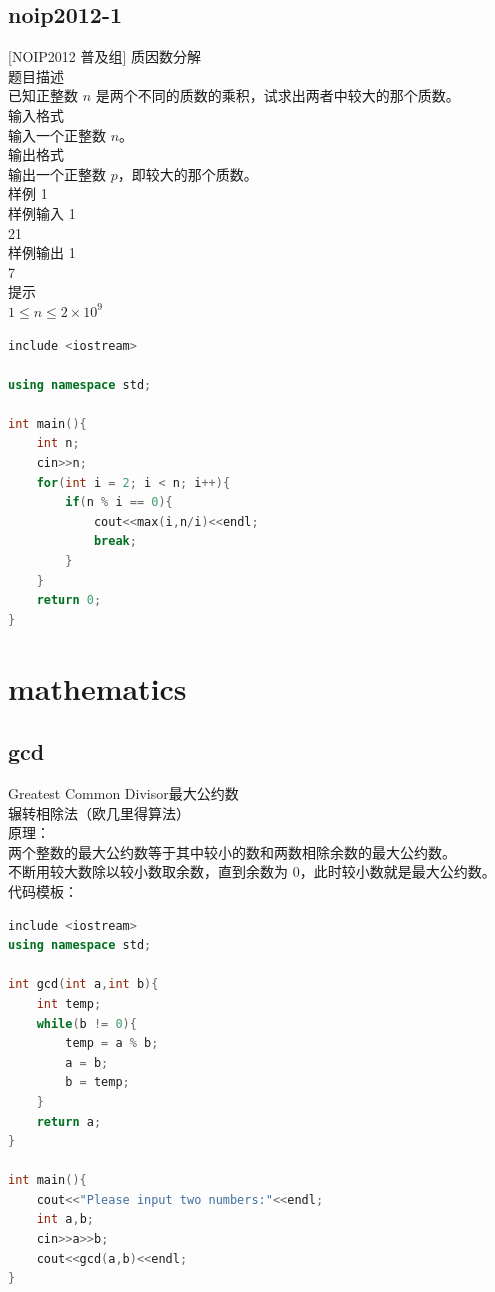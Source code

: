 \documentclass[12pt,twiside,a4paper]{ctexbook}
\numberwithin{chapter}{part}
\begin{document}
\section{noip2012-1}
 [NOIP2012 普及组] 质因数分解\\
 题目描述\\
已知正整数 $n$ 是两个不同的质数的乘积，试求出两者中较大的那个质数。\\
 输入格式\\
输入一个正整数 $n$。\\
 输出格式\\
输出一个正整数 $p$，即较大的那个质数。\\
 样例 1\\
 样例输入 1\\
21\\
 样例输出 1\\
7\\
 提示\\
$1 \le n\le 2\times 10^9$
\begin{lstlisting}[language=C++,breaklines=true]
include <iostream>

using namespace std;

int main(){
	int n;
	cin>>n;
	for(int i = 2; i < n; i++){
		if(n % i == 0){
			cout<<max(i,n/i)<<endl;
			break;
		}
	}
	return 0;
}
\end{lstlisting}

\chapter{mathematics}
\section{gcd}
Greatest Common Divisor最大公约数\\
辗转相除法（欧几里得算法）\\
原理：\\
两个整数的最大公约数等于其中较小的数和两数相除余数的最大公约数。\\
不断用较大数除以较小数取余数，直到余数为 0，此时较小数就是最大公约数。\\
代码模板：
\begin{lstlisting}[language=C++]
include <iostream>
using namespace std;

int gcd(int a,int b){
	int temp;
	while(b != 0){
		temp = a % b;
		a = b;
		b = temp;
	}
	return a;
}

int main(){
	cout<<"Please input two numbers:"<<endl;
	int a,b;
	cin>>a>>b;
	cout<<gcd(a,b)<<endl;
}
\end{lstlisting}
\end{document}
